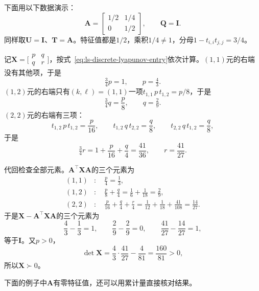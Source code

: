 \begin{example}[离散型方程的逐元素递推]
\label{ex:ls-discrete-lyapunov-entries}
下面用以下数据演示：
\[
 \bm A=\begin{bmatrix}1/2&1/4\\0&1/2\end{bmatrix},\qquad \bm Q=\bm I .
\]
同样取$\bm U=\bm I$、$\bm T=\bm A$。特征值都是$1/2$，乘积$1/4\neq1$，分母$1-t_{i,i}t_{j,j}=3/4$。

记$\bm X=\bigl[\begin{smallmatrix}p&q\\q&r\end{smallmatrix}\bigr]$，按式~\eqref{eq:ls-discrete-lyapunov-entry}依次计算。$(1,1)$元的右端没有其他项，于是
\[
 \tfrac34p=1,\qquad p=\tfrac43 .
\]
$(1,2)$元的右端只有$(k,\ell)=(1,1)$一项$t_{1,1}\,p\,t_{1,2}=p/8$，于是
\[
 \tfrac34q=\frac p8,\qquad q=\tfrac29 .
\]
$(2,2)$元的右端有三项：
\[
 t_{1,2}\,p\,t_{1,2}=\frac{p}{16},\qquad
 t_{1,2}\,q\,t_{2,2}=\frac q8,\qquad
 t_{2,2}\,q\,t_{1,2}=\frac q8,
\]
于是
\[
 \tfrac34r=1+\frac{p}{16}+\frac q4=\frac{41}{36},\qquad r=\frac{41}{27}.
\]

代回检查全部元素。$\bm A^\top\bm X\bm A$的三个元素为
\[
 \begin{aligned}
 (1,1)&:\quad \frac p4=\frac13,\\
 (1,2)&:\quad \frac p8+\frac q4=\frac16+\frac1{18}=\frac29,\\
 (2,2)&:\quad \frac p{16}+\frac q4+\frac r4=\frac1{12}+\frac1{18}+\frac{41}{108}=\frac{14}{27}.
 \end{aligned}
\]
于是$\bm X-\bm A^\top\bm X\bm A$的三个元素为
\[
 \frac43-\frac13=1,\qquad \frac29-\frac29=0,\qquad \frac{41}{27}-\frac{14}{27}=1,
\]
等于$\bm I$。又$p>0$，
\[
 \det\bm X=\frac43\cdot\frac{41}{27}-\frac4{81}=\frac{160}{81}>0 ,
\]
所以$\bm X\succ0$。
\end{example}

下面的例子中$\bm A$有零特征值，还可以用累计量直接核对结果。

